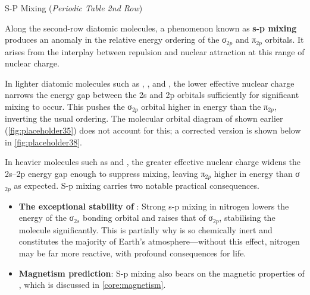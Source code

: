 \documentclass[10pt]{article}
\begin{document}
    \begin{core}{S-P Mixing (\textit{Periodic Table 2nd Row})}

      Along the second-row diatomic molecules, a phenomenon known as \textbf{s-p mixing} produces an anomaly in the relative energy ordering of the σ$_{2p}$ and π$_{2p}$ orbitals. It arises from the interplay between   repulsion and  nuclear attraction at this range of nuclear charge.

      In lighter diatomic molecules such as , , and , the lower effective nuclear charge narrows the energy gap between the 2s and 2p orbitals sufficiently for significant mixing to occur. This pushes the σ$_{2p}$ orbital higher in energy than the π$_{2p}$, inverting the usual ordering. The molecular orbital diagram of  shown earlier (\autoref{fig:placeholder35}) does not account for this; a corrected version is shown below in \autoref{fig:placeholder38}.

      In heavier molecules such as  and , the greater effective nuclear charge widens the 2s--2p energy gap enough to suppress mixing, leaving π$_{2p}$ higher in energy than σ$_{2p}$ as expected. S-p mixing carries two notable practical consequences.

      \begin{itemize}

        \item \textbf{The exceptional stability of }: Strong s-p mixing in nitrogen lowers the energy of the σ$_{2s}$ bonding orbital and raises that of σ$_{2p}$, stabilising the molecule significantly. This is partially why  is so chemically inert and constitutes the majority of Earth's atmosphere---without this effect, nitrogen may be far more reactive, with profound consequences for life.

        \item \textbf{Magnetism prediction}: S-p mixing also bears on the magnetic properties of , which is discussed in \autoref{core:magnetism}.

      \end{itemize}


    \end{core}
\end{document}
